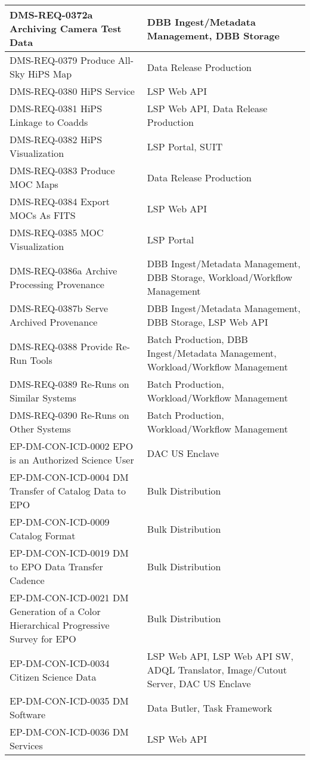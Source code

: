 \begin{longtable}{p{}p{}}
DMS-REQ-0372a Archiving Camera Test Data & DBB Ingest/Metadata Management, DBB Storage \\ \hline
DMS-REQ-0379 Produce All-Sky HiPS Map & Data Release Production \\ \hline
DMS-REQ-0380 HiPS Service & LSP Web API \\ \hline
DMS-REQ-0381 HiPS Linkage to Coadds & LSP Web API, Data Release Production \\ \hline
DMS-REQ-0382 HiPS Visualization & LSP Portal, SUIT \\ \hline
DMS-REQ-0383 Produce MOC Maps & Data Release Production \\ \hline
DMS-REQ-0384 Export MOCs As FITS & LSP Web API \\ \hline
DMS-REQ-0385 MOC Visualization & LSP Portal \\ \hline
DMS-REQ-0386a Archive Processing Provenance & DBB Ingest/Metadata Management, DBB Storage, Workload/Workflow Management \\ \hline
DMS-REQ-0387b Serve Archived Provenance & DBB Ingest/Metadata Management, DBB Storage, LSP Web API \\ \hline
DMS-REQ-0388 Provide Re-Run Tools & Batch Production, DBB Ingest/Metadata Management, Workload/Workflow Management \\ \hline
DMS-REQ-0389 Re-Runs on Similar Systems & Batch Production, Workload/Workflow Management \\ \hline
DMS-REQ-0390 Re-Runs on Other Systems & Batch Production, Workload/Workflow Management \\ \hline
EP-DM-CON-ICD-0002 EPO is an Authorized Science User & DAC US Enclave \\ \hline
EP-DM-CON-ICD-0004 DM Transfer of Catalog Data to EPO & Bulk Distribution \\ \hline
EP-DM-CON-ICD-0009 Catalog Format & Bulk Distribution \\ \hline
EP-DM-CON-ICD-0019 DM to EPO Data Transfer Cadence & Bulk Distribution \\ \hline
EP-DM-CON-ICD-0021 DM Generation of a Color Hierarchical Progressive Survey for EPO & Bulk Distribution \\ \hline
EP-DM-CON-ICD-0034 Citizen Science Data & LSP Web API, LSP Web API SW, ADQL Translator, Image/Cutout Server, DAC US Enclave \\ \hline
EP-DM-CON-ICD-0035 DM Software & Data Butler, Task Framework \\ \hline
EP-DM-CON-ICD-0036 DM Services & LSP Web API \\ \hline

\end{longtable}
